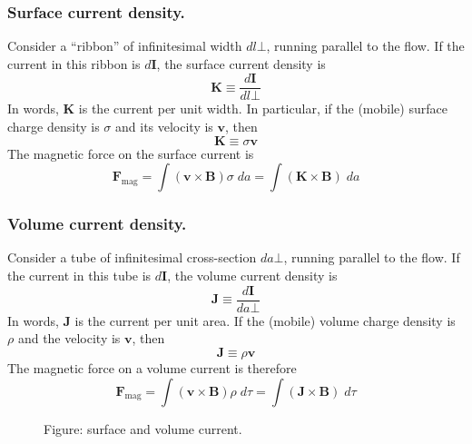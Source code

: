 \documentclass[../../../main.tex]{subfiles}
\begin{document}
\subsubsection{Surface current density.} Consider a “ribbon” of inﬁnitesimal width $dl\bot$, running parallel to the ﬂow. If the current in this ribbon is $d\mathbf{I}$, the surface current density is
\begin{equation*}
    \mathbf{K}\equiv\frac{d\mathbf{I}}{dl\bot}
\end{equation*}
In words, $\mathbf{K}$ is the current per unit width. In particular, if the (mobile) surface charge density is $\sigma$ and its velocity is $\mathbf{v}$, then
\begin{equation*}
    \mathbf{K}\equiv\sigma\mathbf{v}
\end{equation*}
The magnetic force on the surface current is
\begin{equation*}
    \mathbf{F}_{\text{mag}}=\int (\mathbf{v}\times\mathbf{B})\sigma\;da= \int (\mathbf{K}\times\mathbf{B})\;da
\end{equation*}

\subsubsection{Volume current density.} Consider a tube of inﬁnitesimal cross-section $da\bot$, running parallel to the ﬂow. If the current in this tube is $d\mathbf{I}$, the volume current density is
\begin{equation*}
    \mathbf{J}\equiv\frac{d\mathbf{I}}{da\bot}
\end{equation*}
In words, $\mathbf{J}$ is the current per unit area. If the (mobile) volume charge density is $\rho$ and the velocity is $\mathbf{v}$, then
\begin{equation*}
    \mathbf{J}\equiv\rho\mathbf{v}
\end{equation*}
The magnetic force on a volume current is therefore
\begin{equation*}
    \mathbf{F}_{\text{mag}}=\int (\mathbf{v}\times\mathbf{B})\rho\;d\tau= \int (\mathbf{J}\times\mathbf{B})\;d\tau
\end{equation*}

\begin{figure*}
    \centering
    \caption*{Figure: surface and volume current.}
\end{figure*}
\end{document}
